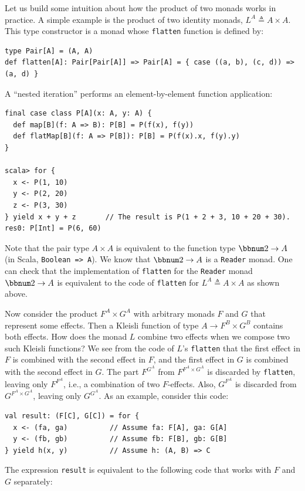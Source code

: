 Let us build some intuition about how the product of two monads works
in practice. A simple example is the product of two identity monads,
$L^{A}\triangleq A\times A$. This type constructor is a monad whose
\lstinline!flatten! function is defined by:
\begin{lstlisting}
type Pair[A] = (A, A)
def flatten[A]: Pair[Pair[A]] => Pair[A] = { case ((a, b), (c, d)) => (a, d) }
\end{lstlisting}
A \textsf{``}nested iteration\textsf{''} performs an element-by-element function application:
\begin{lstlisting}
final case class P[A](x: A, y: A) {
  def map[B](f: A => B): P[B] = P(f(x), f(y))
  def flatMap[B](f: A => P[B]): P[B] = P(f(x).x, f(y).y)
}

scala> for {
  x <- P(1, 10)
  y <- P(2, 20)
  z <- P(3, 30)
} yield x + y + z       // The result is P(1 + 2 + 3, 10 + 20 + 30).
res0: P[Int] = P(6, 60)
\end{lstlisting}

Note that the pair type $A\times A$ is equivalent to the function
type $\bbnum 2\rightarrow A$ (in Scala, \lstinline!Boolean => A!).
We know that $\bbnum 2\rightarrow A$ is a \lstinline!Reader! monad.
One can check that the implementation of \lstinline!flatten! for
the \lstinline!Reader! monad $\bbnum 2\rightarrow A$ is equivalent
to the code of \lstinline!flatten! for $L^{A}\triangleq A\times A$
as shown above.

Now consider the product $F^{A}\times G^{A}$ with arbitrary monads
$F$ and $G$ that represent some effects. Then a Kleisli function
of type $A\rightarrow F^{B}\times G^{B}$ contains both effects. How
does the monad $L$ combine two effects when we compose two such Kleisli
functions? We see from the code of $L$\textsf{'}s \lstinline!flatten! that
the first effect in $F$ is combined with the second effect in $F$,
and the first effect in $G$ is combined with the second effect in
$G$. The part $F^{G^{A}}$ from $F^{F^{A}\times G^{A}}$ is discarded
by \lstinline!flatten!, leaving only $F^{F^{A}}$, i.e., a combination
of two $F$-effects. Also, $G^{F^{A}}$ is discarded from $G^{F^{A}\times G^{A}}$,
leaving only $G^{G^{A}}$. As an example, consider this code:
\begin{lstlisting}
val result: (F[C], G[C]) = for {
  x <- (fa, ga)          // Assume fa: F[A], ga: G[A]
  y <- (fb, gb)          // Assume fb: F[B], gb: G[B]
} yield h(x, y)          // Assume h: (A, B) => C
\end{lstlisting}
The expression \lstinline!result! is equivalent to the following
code that works with $F$ and $G$ separately:\vspace{-0.95\baselineskip}

